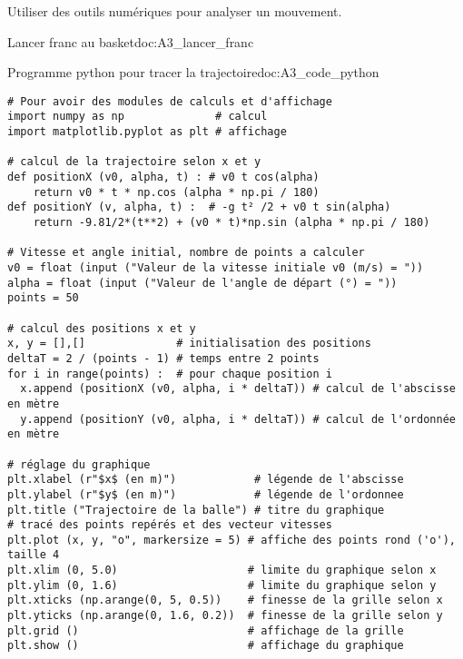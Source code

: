 \teteSndMouv

\nomPrenomClasse
{}

\begin{objectifs}
  \item Utiliser des outils numériques pour analyser un mouvement.
\end{objectifs}

\begin{doc}{Lancer franc au basket}{doc:A3_lancer_franc}
  \begin{center}
  \end{center}
\end{doc}


\begin{doc}{Programme python pour tracer la trajectoire}{doc:A3_code_python}
  \vspace*{-8pt}
  \lstset{style=codePython, language=python}
  \begin{lstlisting}
# Pour avoir des modules de calculs et d'affichage
import numpy as np              # calcul
import matplotlib.pyplot as plt # affichage

# calcul de la trajectoire selon x et y
def positionX (v0, alpha, t) : # v0 t cos(alpha)
    return v0 * t * np.cos (alpha * np.pi / 180) 
def positionY (v, alpha, t) :  # -g t² /2 + v0 t sin(alpha)
    return -9.81/2*(t**2) + (v0 * t)*np.sin (alpha * np.pi / 180) 

# Vitesse et angle initial, nombre de points a calculer
v0 = float (input ("Valeur de la vitesse initiale v0 (m/s) = "))
alpha = float (input ("Valeur de l'angle de départ (°) = "))
points = 50

# calcul des positions x et y
x, y = [],[]              # initialisation des positions
deltaT = 2 / (points - 1) # temps entre 2 points
for i in range(points) :  # pour chaque position i
  x.append (positionX (v0, alpha, i * deltaT)) # calcul de l'abscisse en mètre
  y.append (positionY (v0, alpha, i * deltaT)) # calcul de l'ordonnée en mètre
  
# réglage du graphique
plt.xlabel (r"$x$ (en m)")            # légende de l'abscisse
plt.ylabel (r"$y$ (en m)")            # légende de l'ordonnee
plt.title ("Trajectoire de la balle") # titre du graphique
# tracé des points repérés et des vecteur vitesses
plt.plot (x, y, "o", markersize = 5) # affiche des points rond ('o'), taille 4
plt.xlim (0, 5.0)                    # limite du graphique selon x
plt.ylim (0, 1.6)                    # limite du graphique selon y
plt.xticks (np.arange(0, 5, 0.5))    # finesse de la grille selon x
plt.yticks (np.arange(0, 1.6, 0.2))  # finesse de la grille selon y
plt.grid ()                          # affichage de la grille
plt.show ()                          # affichage du graphique\end{lstlisting}
  \vspace*{-8pt}
\end{doc}

